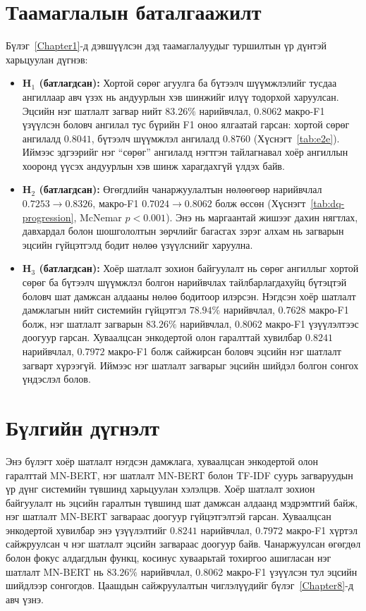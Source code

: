 \section{Таамаглалын баталгаажилт}
\label{sec:hypothesis-check}

Бүлэг~\ref{Chapter1}-д дэвшүүлсэн дэд таамаглалуудыг туршилтын үр дүнтэй
харьцуулан дүгнэв:

\begin{itemize}
  \item \textbf{H$_1$ (батлагдсан):} Хортой сөрөг агуулга ба бүтээлч
    шүүмжлэлийг тусдаа ангиллаар авч үзэх нь андуурлын хэв шинжийг илүү
    тодорхой харуулсан. Эцсийн нэг шатлалт загвар нийт $83.26\%$ нарийвчлал,
    $\mathbf{0.8062}$ макро-F1 үзүүлсэн боловч ангилал тус бүрийн F1 оноо
    ялгаатай гарсан: хортой сөрөг ангилалд $0.8041$, бүтээлч шүүмжлэл
    ангилалд $0.8760$ (Хүснэгт~\ref{tab:e2e}). Иймээс эдгээрийг нэг
    ``сөрөг'' ангилалд нэгтгэн тайлагнавал хоёр ангиллын хооронд үүсэх
    андуурлын хэв шинж харагдахгүй үлдэх байв.
  \item \textbf{H$_2$ (батлагдсан):} Өгөгдлийн чанаржуулалтын нөлөөгөөр
    нарийвчлал $0.7253\to0.8326$, макро-F1 $0.7024\to0.8062$ болж өссөн
    (Хүснэгт~\ref{tab:dq-progression}, McNemar $p<0.001$). Энэ нь маргаантай
    жишээг дахин нягтлах, давхардал болон шошгололтын зөрчлийг багасгах зэрэг
    алхам нь загварын эцсийн гүйцэтгэлд бодит нөлөө үзүүлснийг харуулна.
  \item \textbf{H$_3$ (батлагдсан):} Хоёр шатлалт зохион байгуулалт нь сөрөг
    ангиллыг хортой сөрөг ба бүтээлч шүүмжлэл болгон нарийвчлах тайлбарлагдахуйц
    бүтэцтэй боловч шат дамжсан алдааны нөлөө бодитоор илэрсэн. Нэгдсэн
    хоёр шатлалт дамжлагын нийт системийн гүйцэтгэл $78.94\%$ нарийвчлал,
    $0.7628$ макро-F1 болж, нэг шатлалт загварын $83.26\%$ нарийвчлал,
    $0.8062$ макро-F1 үзүүлэлтээс доогуур гарсан. Хуваалцсан энкодертой
    олон гаралттай хувилбар $0.8241$ нарийвчлал, $0.7972$ макро-F1 болж
    сайжирсан боловч эцсийн нэг шатлалт загварт хүрээгүй.
    Иймээс нэг шатлалт загварыг эцсийн шийдэл болгон сонгох үндэслэл болов.
\end{itemize}

\section{Бүлгийн дүгнэлт}

Энэ бүлэгт хоёр шатлалт нэгдсэн дамжлага, хуваалцсан энкодертой олон гаралттай
MN-BERT, нэг шатлалт MN-BERT болон TF-IDF суурь загваруудын үр дүнг системийн
түвшинд харьцуулан хэлэлцэв. Хоёр шатлалт зохион байгуулалт нь эцсийн гаралтын
түвшинд шат дамжсан алдаанд мэдрэмтгий байж, нэг шатлалт MN-BERT загвараас
доогуур гүйцэтгэлтэй гарсан. Хуваалцсан энкодертой хувилбар энэ үзүүлэлтийг
$0.8241$ нарийвчлал, $0.7972$ макро-F1 хүртэл сайжруулсан ч нэг шатлалт эцсийн
загвараас доогуур байв. Чанаржуулсан өгөгдөл болон фокус алдагдлын функц,
косинус хуваарьтай тохиргоо ашигласан нэг шатлалт MN-BERT нь
$\mathbf{83.26\%}$ нарийвчлал, $\mathbf{0.8062}$ макро-F1 үзүүлсэн тул эцсийн
шийдлээр сонгогдов.
Цаашдын сайжруулалтын чиглэлүүдийг бүлэг~\ref{Chapter8}-д авч үзнэ.
